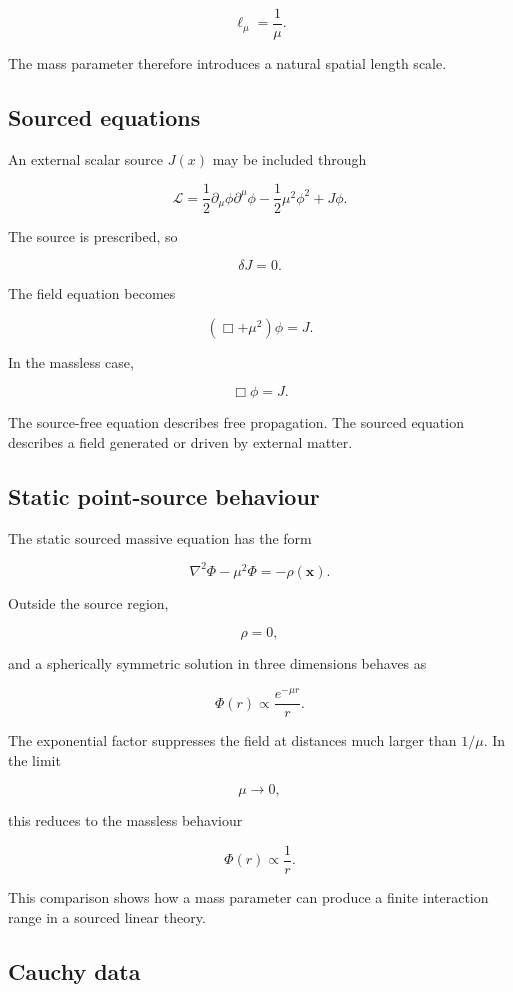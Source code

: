 \[
\boxed{
\ell_{\mu}=\frac{1}{\mu}
}.
\]

The mass parameter therefore introduces a natural spatial length scale.

\subsection{Sourced equations}

An external scalar source \(J(x)\) may be included through

\[
\mathcal{L}
=
\frac{1}{2}
\partial_{\mu}\phi\partial^{\mu}\phi
-
\frac{1}{2}\mu^{2}\phi^{2}
+
J\phi.
\]

The source is prescribed, so

\[
\delta J=0.
\]

The field equation becomes

\[
\boxed{
(\Box+\mu^{2})\phi=J
}.
\]

In the massless case,

\[
\Box\phi=J.
\]

The source-free equation describes free propagation. The sourced equation describes a field generated or driven by external matter.

\subsection{Static point-source behaviour}

The static sourced massive equation has the form

\[
\nabla^{2}\Phi
-
\mu^{2}\Phi
=
-\rho(\mathbf{x}).
\]

Outside the source region,

\[
\rho=0,
\]

and a spherically symmetric solution in three dimensions behaves as

\[
\boxed{
\Phi(r)
\propto
\frac{e^{-\mu r}}{r}
}.
\]

The exponential factor suppresses the field at distances much larger than \(1/\mu\). In the limit

\[
\mu\to0,
\]

this reduces to the massless behaviour

\[
\Phi(r)
\propto
\frac{1}{r}.
\]

This comparison shows how a mass parameter can produce a finite interaction range in a sourced linear theory.

\subsection{Cauchy data}

